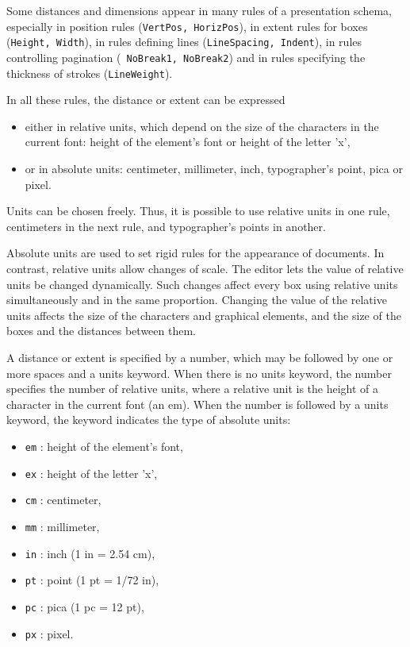 Some distances and dimensions appear in many rules of a presentation
schema, especially in position rules ({\tt VertPos, HorizPos}), in
extent rules for boxes ({\tt Height, Width}), in rules defining lines
({\tt LineSpacing, Indent}), in rules controlling pagination ({\tt
NoBreak1, NoBreak2}) and in rules specifying the thickness of strokes
({\tt LineWeight}).

In all these rules, the distance or extent can be expressed
\begin{itemize}
   \item either in relative units, which depend on the size of the
         characters in the current font: height of the element's font or
         height of the letter 'x',
   \item or in absolute units: centimeter, millimeter, inch, typographer's
         point, pica or pixel.
\end{itemize}
Units can be chosen freely.  Thus, it is possible to use relative units in
one rule, centimeters in the next rule, and typographer's points in
another.

Absolute units are used to set rigid rules for the appearance of
documents.  In contrast, relative units allow changes of scale.  The
editor lets the value of relative units be changed dynamically.  Such
changes affect every box using relative units simultaneously and in
the same proportion.  Changing the value of the relative units affects
the size of the characters and graphical elements, and the size of the
boxes and the distances between them.

\label{distance}
A distance or extent is specified by a number, which may be followed by
one or more spaces and a units keyword.  When there is no units
keyword, the number specifies the number of relative units, where a
relative unit is the height of a character in the current font (an
em).  When the number is followed by a units keyword, the keyword
indicates the type of absolute units:
\begin{itemize}
   \item {\tt em} : height of the element's font,
   \item {\tt ex} : height of the letter 'x',
   \item {\tt cm} : centimeter,
   \item {\tt mm} : millimeter,
   \item {\tt in} : inch (1 in = 2.54 cm),
   \item {\tt pt} : point (1 pt = 1/72 in),
   \item {\tt pc} : pica (1 pc = 12 pt),
   \item {\tt px} : pixel.
\end{itemize}

